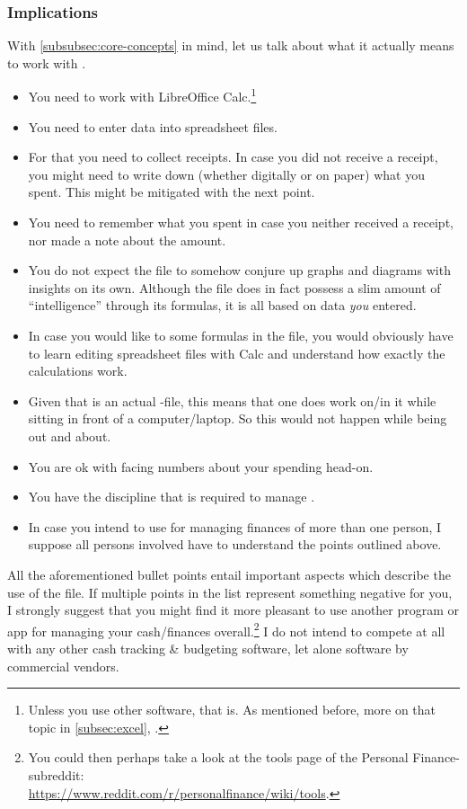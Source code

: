 \subsubsection{Implications}
\label{subsubsec:implications}

With \autoref{subsubsec:core-concepts} in mind, let us talk about what it actually means to work with \tfn.

\begin{itemize}
	\item You need to work with LibreOffice Calc.\footnote{Unless you use other software, that is.
	As mentioned before, more on that topic in \autoref{subsec:excel}, .}
	\item You need to enter data into spreadsheet files.
	\item For that you need to collect receipts.
	In case you did not receive a receipt, you might need to write down (whether digitally or on paper) what you spent.
	This might be mitigated with the next point.
	\item You need to remember what you spent in case you neither received a receipt, nor made a note about the amount.
	\item You do not expect the file to somehow conjure up graphs and diagrams with insights on its own.
	Although the file does in fact possess a slim amount of ``intelligence'' through its formulas, it is all based on data \emph{you} entered.
	\item In case you would like to some formulas in the file, you would obviously have to learn editing spreadsheet files with Calc and understand how exactly the calculations work.
	\item Given that \tfn is an actual -file, this means that one does work on/in it while sitting in front of a computer/laptop.
	So this would not happen while being out and about.
	\item You are ok with facing numbers about your spending head-on.
	\item You have the discipline that is required to manage \tfn.
	\item In case you intend to use \tfn for managing finances of more than one person, I suppose all persons involved have to understand the points outlined above.
\end{itemize}
All the aforementioned bullet points entail important aspects which describe the use of the file.
If multiple points in the list represent something negative for you, I strongly suggest that you might find it more pleasant to use another program or app for managing your cash/finances overall.\footnote{You could then perhaps take a look at the tools page of the Personal Finance-subreddit:\\
\href{https://www.reddit.com/r/personalfinance/wiki/tools}{https://www.reddit.com/r/personalfinance/wiki/tools}.}
I do not intend to compete at all with any other cash tracking \& budgeting software, let alone software by commercial vendors.

